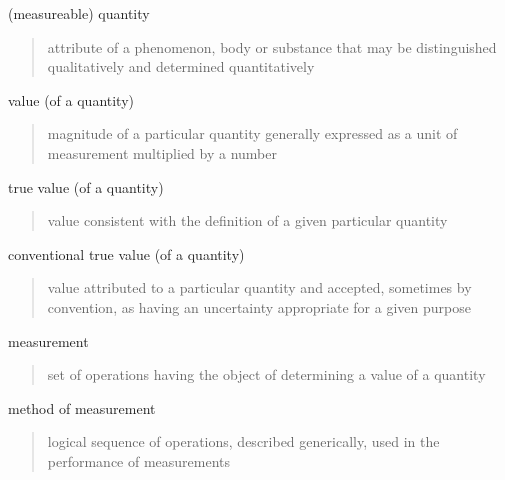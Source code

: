 \documentclass[avery5371,grid]{flashcards}
\begin{document}


\begin{flashcard}[Defintion]{(measureable) quantity}
\hfill\vfill
\begin{quote}
    attribute of a phenomenon, body or substance that may be distinguished qualitatively and determined quantitatively
\end{quote}
\vfill
\end{flashcard}

\begin{flashcard}[Defintion]{value (of a quantity)}
\hfill\vfill
\begin{quote}
    magnitude of a particular quantity generally expressed as a unit of measurement multiplied by a number
\end{quote}
\vfill
\end{flashcard}

\begin{flashcard}[Defintion]{true value (of a quantity)}
\hfill\vfill
\begin{quote}
    value consistent with the definition of a given particular quantity
\end{quote}
\vfill
\end{flashcard}

\begin{flashcard}[Defintion]{conventional true value (of a quantity)}
\hfill\vfill
\begin{quote}
    value attributed to a particular quantity and accepted, sometimes by convention, as having an uncertainty appropriate for a given purpose
\end{quote}
\vfill
\end{flashcard}

\begin{flashcard}[Defintion]{measurement}
\hfill\vfill
\begin{quote}
    set of operations having the object of determining a value of a quantity
\end{quote}
\vfill
\end{flashcard}

\begin{flashcard}[Defintion]{method of measurement}
\hfill\vfill
\begin{quote}
    logical sequence of operations, described generically, used in the performance of measurements
\end{quote}
\vfill
\end{flashcard}
\end{document}
